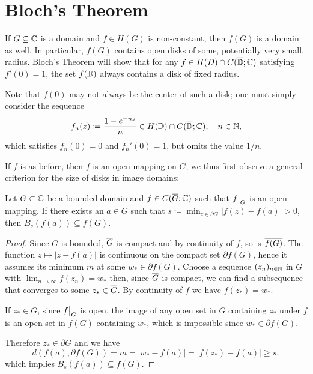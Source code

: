 \section{Bloch's Theorem}
\label{sec:blochs-theorem}

If $G \subseteq \mathbb{C}$ is a domain and $f \in H(G)$ is non-constant, then $f(G)$ is a domain as well. In particular, $f(G)$ contains open disks of some, potentially very small, radius. Bloch's Theorem will show that for any $f \in H(D) \cap C(\overline{\mathbb{D}}; \mathbb{C})$ satisfying $f'(0) = 1$, the set $f(\mathbb{D})$ always contains a disk of fixed radius.

Note that $f(0)$ may not always be the center of such a disk; one must simply consider the sequence
\begin{equation*}
    f_n(z) \coloneqq \frac{1 - e^{- n z}}{n} \in H(\mathbb{D}) \cap C(\overline{\mathbb{D}}; \mathbb{C}), \quad n \in \mathbb{N},
\end{equation*}
which satisfies $f_n(0) = 0$ and $f_n'(0) = 1$, but omits the value $1 / n$.

If $f$ is as before, then $f$ is an open mapping on $G$; we thus first observe a general criterion for the size of disks in image domains:

\begin{lemma} \label{lem:bloch-lemma-1}
    Let $G \subset \mathbb{C}$ be a bounded domain and $f \in C(\overline{G}; \mathbb{C})$ such that $\restr{f}{G}$ is an open mapping. If there exists an $a \in G$ such that $s \coloneqq \min_{z \in \partial G} \vert f(z) - f(a) \vert > 0$, then $B_{s}(f(a)) \subseteq f(G)$.
\end{lemma}

\begin{proof}
    Since $G$ is bounded, $\overline{G}$ is compact and by continuity of $f$, so is $\overline{f(G)}$.
    The function $z \mapsto \vert z - f(a) \vert$ is continuous on the compact set $\partial f(G)$, hence it assumes its minimum $m$ at some $w_* \in \partial f(G)$. Choose a sequence $(z_n)_{n \in \mathbb{N}}$ in $G$ with $\lim_{n \to \infty} f(z_n) = w_*$ then, since $\overline{G}$ is compact, we can find a subsequence that converges to some $z_* \in \overline{G}$. By continuity of $f$ we have $f(z_*) = w_*$.

    If $z_* \in G$, since $\restr{f}{G}$ is open, the image of any open set in $G$ containing $z_*$ under $f$ is an open set in $f(G)$ containing $w_*$, which is impossible since $w_* \in \partial f(G)$.

    Therefore $z_* \in \partial G$ and we have
    $$ d(f(a), \partial f(G)) = m = \vert w_* - f(a) \vert = \vert f(z_*) - f(a) \vert \geq s, $$
    which implies $B_{s}(f(a)) \subseteq f(G)$.
\end{proof}

